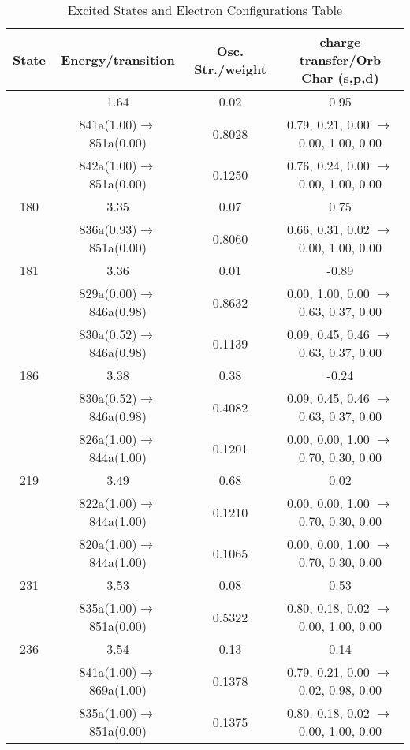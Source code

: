 \documentclass[10pt,a4paper]{article}
\begin{document}
 \centering
 \begin{longtable}{c|c|c|c}
   \caption{Excited States and Electron Configurations Table}
   \hline
     State & Energy/transition & Osc. Str./weight & charge transfer/Orb Char (s,p,d)\\
    \hline 
 
   \endfirsthead 
   \hline
   \endhead
   \hline
   \endfoot
   \endlastfoot 
40 &	 1.64 &	 0.02 &	 0.95 \\ 
  	& 841a(1.00)$\rightarrow$851a(0.00) &	 0.8028 &	 0.79, 0.21, 0.00 $\rightarrow$ 0.00, 1.00, 0.00 \\ 
 	& 842a(1.00)$\rightarrow$851a(0.00) &	 0.1250 &	 0.76, 0.24, 0.00 $\rightarrow$ 0.00, 1.00, 0.00 \\ 
 \hline180 &	 3.35 &	 0.07 &	 0.75 \\ 
  	& 836a(0.93)$\rightarrow$851a(0.00) &	 0.8060 &	 0.66, 0.31, 0.02 $\rightarrow$ 0.00, 1.00, 0.00 \\ 
 \hline181 &	 3.36 &	 0.01 &	 -0.89 \\ 
  	& 829a(0.00)$\rightarrow$846a(0.98) &	 0.8632 &	 0.00, 1.00, 0.00 $\rightarrow$ 0.63, 0.37, 0.00 \\ 
 	& 830a(0.52)$\rightarrow$846a(0.98) &	 0.1139 &	 0.09, 0.45, 0.46 $\rightarrow$ 0.63, 0.37, 0.00 \\ 
 \hline186 &	 3.38 &	 0.38 &	 -0.24 \\ 
  	& 830a(0.52)$\rightarrow$846a(0.98) &	 0.4082 &	 0.09, 0.45, 0.46 $\rightarrow$ 0.63, 0.37, 0.00 \\ 
 	& 826a(1.00)$\rightarrow$844a(1.00) &	 0.1201 &	 0.00, 0.00, 1.00 $\rightarrow$ 0.70, 0.30, 0.00 \\ 
 \hline219 &	 3.49 &	 0.68 &	 0.02 \\ 
  	& 822a(1.00)$\rightarrow$844a(1.00) &	 0.1210 &	 0.00, 0.00, 1.00 $\rightarrow$ 0.70, 0.30, 0.00 \\ 
 	& 820a(1.00)$\rightarrow$844a(1.00) &	 0.1065 &	 0.00, 0.00, 1.00 $\rightarrow$ 0.70, 0.30, 0.00 \\ 
 \hline231 &	 3.53 &	 0.08 &	 0.53 \\ 
  	& 835a(1.00)$\rightarrow$851a(0.00) &	 0.5322 &	 0.80, 0.18, 0.02 $\rightarrow$ 0.00, 1.00, 0.00 \\ 
 \hline236 &	 3.54 &	 0.13 &	 0.14 \\ 
  	& 841a(1.00)$\rightarrow$869a(1.00) &	 0.1378 &	 0.79, 0.21, 0.00 $\rightarrow$ 0.02, 0.98, 0.00 \\ 
 	& 835a(1.00)$\rightarrow$851a(0.00) &	 0.1375 &	 0.80, 0.18, 0.02 $\rightarrow$ 0.00, 1.00, 0.00 \\ 

\end{longtable}
\end{document}
